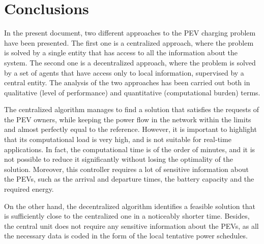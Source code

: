 \section{Conclusions}
In the present document, two different approaches to the PEV charging problem have been presented. The first one is a centralized approach, where the problem is solved by a single entity that has access to all the information about the system. The second one is a decentralized approach, where the problem is solved by a set of agents that have access only to local information, supervised by a central entity. The analysis of the two approaches has been carried out both in qualitative (level of performance) and quantitative (computational burden) terms.

The centralized algorithm manages to find a solution that satisfies the requests of the PEV owners, while keeping the power flow in the network within the limits and almost perfectly equal to the reference. However, it is important to highlight that its computational load is very high, and is not suitable for real-time applications. In fact, the computational time is of the order of minutes, and it is not possible to reduce it significantly without losing the optimality of the solution. Moreover, this controller requires a lot of sensitive information about the PEVs, such as the arrival and departure times, the battery capacity and the required energy. 

On the other hand, the decentralized algorithm identifies a feasible solution that is sufficiently close to the centralized one in a noticeably shorter time. Besides, the central unit does not require any sensitive information about the PEVs, as all the necessary data is coded in the form of the local tentative power schedules.